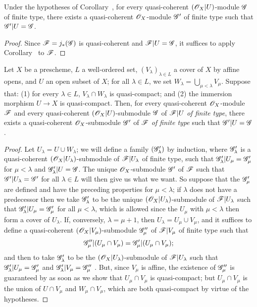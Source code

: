 \begin{corollary}[9.4.5]
\label{I.9.4.5}
Under the hypotheses of Corollary~, for every quasi-coherent $(\mathscr{O}_X|U)$-module
$\mathscr{G}$ of finite type, there exists a quasi-coherent $\mathscr{O}_X$-module $\mathscr{G}'$ of finite
type such that $\mathscr{G}'|U=\mathscr{G}$.
\end{corollary}

\begin{proof}
Since $\mathscr{F}=j_*(\mathscr{G})$ is quasi-coherent  and $\mathscr{F}|U=\mathscr{G}$, it
suffices to apply Corollary~ to $\mathscr{F}$.
\end{proof}

\begin{lemma}[9.4.6]
\label{I.9.4.6}
Let $X$ be a prescheme, $L$ a well-ordered set, $(V_\lambda)_{\lambda\in L}$ a cover of $X$
by affine opens, and $U$ an open subset of $X$; for all $\lambda\in L$, we set
$W_\lambda=\bigcup_{\mu<\lambda}V_\mu$. Suppose that: (1) for every $\lambda\in L$,
$V_\lambda\cap W_\lambda$ is quasi-compact; and (2) the immersion morphism $U\to X$ is
quasi-compact. Then, for every quasi-coherent $\mathscr{O}_X$-module $\mathscr{F}$ and every
quasi-coherent $(\mathscr{O}_X|U)$-submodule $\mathscr{G}$ of $\mathscr{F}|U$ \emph{of finite type}, there
exists a quasi-coherent $\mathscr{O}_X$-submodule $\mathscr{G}'$ of $\mathscr{F}$ \emph{of finite type} such
that $\mathscr{G}'|U=\mathscr{G}$.
\end{lemma}

\begin{proof}
Let $U_\lambda=U\cup W_\lambda$; we will define a family $(\mathscr{G}'_\lambda)$ by induction,
where $\mathscr{G}'_\lambda$ is a quasi-coherent $(\mathscr{O}_X|U_\lambda)$-submodule of
$\mathscr{F}|U_\lambda$ of finite type, such that $\mathscr{G}'_\lambda|U_\mu=\mathscr{G}'_\mu$ for
$\mu<\lambda$ and $\mathscr{G}'_\lambda|U=\mathscr{G}$. The unique $\mathscr{O}_X$-submodule $\mathscr{G}'$ of
$\mathscr{F}$ such that $\mathscr{G}'|U_\lambda=\mathscr{G}'$ for all $\lambda\in L$  will then give
us what we want. So suppose that the $\mathscr{G}'_\mu$ are defined and have the preceding
properties for $\mu<\lambda$; if $\lambda$ does not have a predecessor then we take
$\mathscr{G}'_\lambda$ to be the unique $(\mathscr{O}_X|U_\lambda)$-submodule of $\mathscr{F}|U_\lambda$ such that
$\mathscr{G}'_\lambda|U_\mu=\mathscr{G}'_\mu$ for all $\mu<\lambda$, which is allowed since the $U_\mu$
with $\mu<\lambda$ then form a cover of $U_\lambda$. If, conversely, $\lambda=\mu+1$, then
$U_\lambda=U_\mu\cup V_\mu$, and it suffices to define a quasi-coherent
$(\mathscr{O}_X|V_\mu)$-submodule $\mathscr{G}''_\mu$ of $\mathscr{F}|V_\mu$ of finite type such that
\[
  \mathscr{G}''_\mu|(U_\mu\cap V_\mu)=\mathscr{G}'_\mu|(U_\mu\cap V_\mu);
\]
and then to take $\mathscr{G}'_\lambda$ to be the $(\mathscr{O}_X|U_\lambda)$-submodule of
$\mathscr{F}|U_\lambda$ such that $\mathscr{G}'_\lambda|U_\mu=\mathscr{G}'_\mu$ and
$\mathscr{G}'_\lambda|V_\mu=\mathscr{G}''_\mu$ . But, since $V_\mu$ is affine, the
existence of $\mathscr{G}''_\mu$ is guaranteed by  as soon as we show that
$U_\mu\cap V_\mu$ is quasi-compact; but $U_\mu\cap V_\mu$ is the union of $U\cap V_\mu$ and
$W_\mu\cap V_\mu$, which are both quasi-compact by virtue of the hypotheses.
\end{proof}

